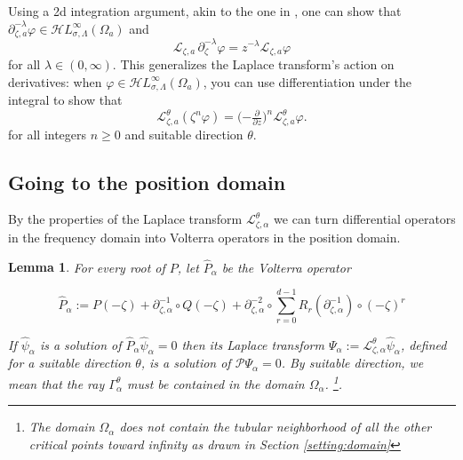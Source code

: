 \documentclass{article}
\theoremstyle{plain}
\newtheorem{lemma}{Lemma}
\newcommand{\R}{\mathbb{R}}
\newcommand{\laplace}{\mathcal{L}}
\newcommand{\fracderiv}[3]{\partial^{#1}_{#2, #3}}
\newcommand{\singexp}[2]{\mathcal{H}L^\infty_{#1, #2}}
\begin{document}

Using a 2d integration argument, akin to the one in \cite[Theorem~2.39]{laplace-tfm}, one can show that $\partial^{-\lambda}_{\zeta,a} \varphi \in \singexp{\sigma}{\Lambda}(\Omega_a)$ and
\[ \laplace_{\zeta,a}\,\partial^{-\lambda}_{\zeta} \varphi = z^{-\lambda} \laplace_{\zeta, a} \varphi \]
for all $\lambda \in (0, \infty)$. This generalizes the Laplace transform's action on derivatives: when $\varphi \in \singexp{\sigma}{\Lambda}(\Omega_a)$, you can use differentiation under the integral to show that~\cite[Theorem~1.34]{laplace-tfm}
\begin{equation}%
\laplace_{\zeta,a}^\theta (\zeta^n \varphi) = \big({-\tfrac{\partial}{\partial z}}\big)^n \laplace_{\zeta,a}^\theta \varphi.
\end{equation}
for all integers $n \ge 0$ and suitable direction $\theta$.

\subsection{Going to the position domain}

By the properties of the Laplace transform $\laplace_{\zeta,\alpha}^{\theta}$ we can turn differential operators in the frequency domain into Volterra operators in the position domain. 

\begin{lemma}
 For every root of $P$, let $\hat{P}_{\alpha}$ be the Volterra operator 
 
\begin{equation}\label{P-hat_j}
\hat{P}_\alpha:=P(-\zeta)+\partial_{\zeta,\alpha}^{-1}\circ Q(-\zeta)+\partial_{\zeta,\alpha}^{-2}\circ\sum_{r=0}^{d-1}R_r(\partial_{\zeta,\alpha}^{-1})\circ (-\zeta)^r
\end{equation}
 
If $\hat{\psi}_\alpha$ is a solution of $\hat{P}_\alpha\hat{\psi}_\alpha=0$ then its Laplace transform $\Psi_\alpha:=\laplace_{\zeta,\alpha}^{\theta}\hat{\psi}_\alpha$, defined for a suitable direction $\theta$, is a solution of $\mathcal{P}\Psi_\alpha=0$. By suitable direction, we mean that the ray $\Gamma_{\alpha}^\theta$ must be contained in the domain $\Omega_{\alpha}$. \footnote{The domain $\Omega_{\alpha}$ does not contain the tubular neighborhood of all the other critical points toward infinity as drawn in Section \ref{setting:domain}}.      
\end{lemma}
\end{document}

